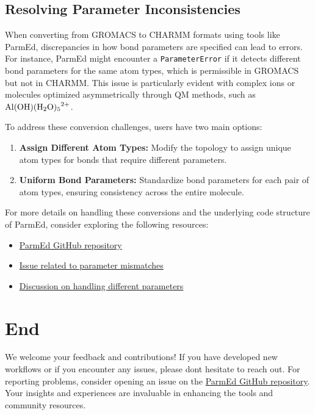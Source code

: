 \documentclass[
]{article}
\begin{document}
\hypertarget{resolving-parameter-inconsistencies}{%
\subsection{Resolving Parameter
Inconsistencies}\label{resolving-parameter-inconsistencies}}

When converting from GROMACS to CHARMM formats using tools like ParmEd,
discrepancies in how bond parameters are specified can lead to errors.
For instance, ParmEd might encounter a \texttt{ParameterError} if it
detects different bond parameters for the same atom types, which is
permissible in GROMACS but not in CHARMM. This issue is particularly
evident with complex ions or molecules optimized asymmetrically through
QM methods, such as \(\ce{Al(OH)(H2O)5^2+}\).

To address these conversion challenges, users have two main options:

\begin{enumerate}
\def\labelenumi{\arabic{enumi}.}
\item
  \textbf{Assign Different Atom Types:} Modify the topology to assign
  unique atom types for bonds that require different parameters.
\item
  \textbf{Uniform Bond Parameters:} Standardize bond parameters for each
  pair of atom types, ensuring consistency across the entire molecule.
\end{enumerate}

For more details on handling these conversions and the underlying code
structure of ParmEd, consider exploring the following resources:

\begin{itemize}
\item
  \href{https://github.com/ParmEd/ParmEd}{ParmEd GitHub repository}
\item
  \href{https://github.com/ParmEd/ParmEd/issues/1111}{Issue related to
  parameter mismatches}
\item
  \href{https://github.com/ParmEd/ParmEd/issues/968}{Discussion on
  handling different parameters}
\end{itemize}

\hypertarget{end}{%
\section{End}\label{end}}

We welcome your feedback and contributions! If you have developed new
workflows or if you encounter any issues, please don\textquotesingle t
hesitate to reach out. For reporting problems, consider opening an issue
on the \href{https://github.com/ParmEd/ParmEd/issues}{ParmEd GitHub
repository}. Your insights and experiences are invaluable in enhancing
the tools and community resources.
\end{document}
